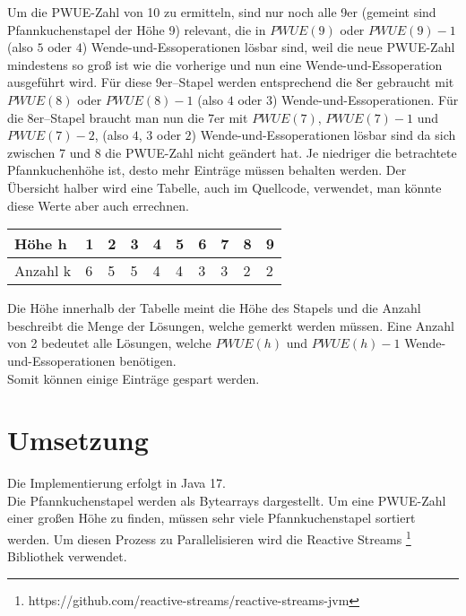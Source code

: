Um die PWUE-Zahl von 10 zu ermitteln, sind nur noch alle 9er (gemeint sind Pfannkuchenstapel der Höhe 9) relevant,
die in $PWUE(9)$ oder $PWUE(9) - 1$ (also $5$ oder $4$) Wende-und-Essoperationen lösbar sind, weil die neue PWUE-Zahl
mindestens so gro{\ss} ist wie die vorherige und nun eine Wende-und-Essoperation ausgeführt wird.
Für diese 9er--Stapel werden entsprechend die 8er gebraucht mit $PWUE(8)$ oder $PWUE(8) - 1$
(also $4$ oder $3$) Wende-und-Essoperationen.
Für die 8er--Stapel braucht man nun die 7er mit $PWUE(7)$, $PWUE(7) - 1$ und $PWUE(7) - 2$,
(also $4$, $3$ oder $2$) Wende-und-Essoperationen lösbar sind da sich zwischen 7 und 8 die PWUE-Zahl nicht geändert hat.
Je niedriger die betrachtete Pfannkuchenhöhe ist, desto mehr Einträge müssen behalten werden.
Der Übersicht halber wird eine Tabelle, auch im Quellcode, verwendet, man könnte diese Werte aber auch errechnen. \\
\begin{table}[h]
    \centering
    \begin{tabular}{|l|l|l|l|l|l|l|l|l|l|}
        \hline
        Höhe h   & 1 & 2 & 3 & 4 & 5 & 6 & 7 & 8 & 9 \\ \hline
        Anzahl k & 6 & 5 & 5 & 4 & 4 & 3 & 3 & 2 & 2 \\ \hline
    \end{tabular}
    \label{tab:k-fuer-10}
\end{table}
Die Höhe innerhalb der Tabelle meint die Höhe des Stapels und die Anzahl beschreibt die Menge der Lösungen, welche gemerkt werden müssen.
Eine Anzahl von 2 bedeutet alle Lösungen, welche $PWUE(h)$ und $PWUE(h) - 1$ Wende-und-Essoperationen benötigen. \\
Somit können einige Einträge gespart werden.


\section{Umsetzung}\label{sec:umsetzung}
Die Implementierung erfolgt in Java 17. \\
Die Pfannkuchenstapel werden als Bytearrays dargestellt.
Um eine PWUE-Zahl einer gro{\ss}en Höhe zu finden, müssen sehr viele Pfannkuchenstapel sortiert werden.
Um diesen Prozess zu Parallelisieren wird die Reactive Streams \footnote{https://github.com/reactive-streams/reactive-streams-jvm}
Bibliothek verwendet. \\

